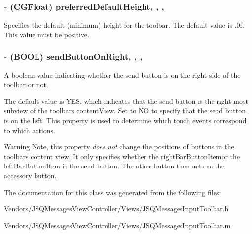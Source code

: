 \subsubsection[{preferred\+Default\+Height}]{\setlength{\rightskip}{0pt plus 5cm}-\/ (C\+G\+Float) preferred\+Default\+Height\hspace{0.3cm}{\ttfamily [read]}, {\ttfamily [write]}, {\ttfamily [nonatomic]}, {\ttfamily [assign]}}\label{interface_j_s_q_messages_input_toolbar_aab6cdb4bf7fc9221c06adb7b18b7c239}
Specifies the default (minimum) height for the toolbar. The default value is {.\+0f}. This value must be positive. \hypertarget{interface_j_s_q_messages_input_toolbar_aba8383e330cbdf4187991ee810709751}{}
\subsubsection[{send\+Button\+On\+Right}]{\setlength{\rightskip}{0pt plus 5cm}-\/ (B\+O\+O\+L) send\+Button\+On\+Right\hspace{0.3cm}{\ttfamily [read]}, {\ttfamily [write]}, {\ttfamily [nonatomic]}, {\ttfamily [assign]}}\label{interface_j_s_q_messages_input_toolbar_aba8383e330cbdf4187991ee810709751}
A boolean value indicating whether the send button is on the right side of the toolbar or not.

The default value is {\ttfamily Y\+E\+S}, which indicates that the send button is the right-\/most subview of the toolbar\textquotesingle{}s {\ttfamily content\+View}. Set to {\ttfamily N\+O} to specify that the send button is on the left. This property is used to determine which touch events correspond to which actions.

\begin{DoxyWarning}{Warning}
Note, this property {\itshape does not} change the positions of buttons in the toolbar\textquotesingle{}s content view. It only specifies whether the {\ttfamily right\+Bar\+Button\+Item}or the {\ttfamily left\+Bar\+Button\+Item} is the send button. The other button then acts as the accessory button. 
\end{DoxyWarning}


The documentation for this class was generated from the following files\+:\begin{DoxyCompactItemize}
\item 
Vendors/\+J\+S\+Q\+Messages\+View\+Controller/\+Views/J\+S\+Q\+Messages\+Input\+Toolbar.\+h\item 
Vendors/\+J\+S\+Q\+Messages\+View\+Controller/\+Views/J\+S\+Q\+Messages\+Input\+Toolbar.\+m\end{DoxyCompactItemize}
